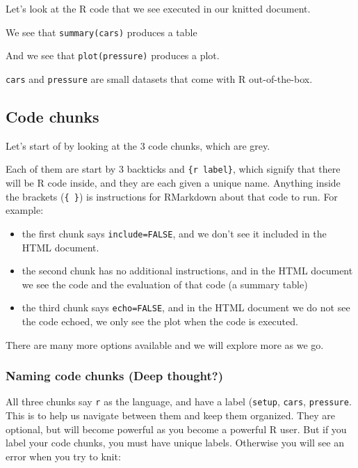 \documentclass[]{book}
\providecommand{\tightlist}{%
  \setlength{\itemsep}{0pt}\setlength{\parskip}{0pt}}
\begin{document}
Let's look at the R code that we see executed in our knitted document.

We see that \texttt{summary(cars)} produces a table

And we see that \texttt{plot(pressure)} produces a plot.

\texttt{cars} and \texttt{pressure} are small datasets that come with R out-of-the-box.

\hypertarget{code-chunks}{%
\subsection{Code chunks}\label{code-chunks}}

Let's start of by looking at the 3 code chunks, which are grey.

Each of them are start by 3 backticks and \texttt{\{r\ label\}}, which signify that there will be R code inside, and they are each given a unique name. Anything inside the brackets (\texttt{\{\ \}}) is instructions for RMarkdown about that code to run. For example:

\begin{itemize}
\tightlist
\item
  the first chunk says \texttt{include=FALSE}, and we don't see it included in the HTML document.
\item
  the second chunk has no additional instructions, and in the HTML document we see the code and the evaluation of that code (a summary table)
\item
  the third chunk says \texttt{echo=FALSE}, and in the HTML document we do not see the code echoed, we only see the plot when the code is executed.
\end{itemize}

There are many more options available and we will explore more as we go.

\hypertarget{naming-code-chunks-deep-thought}{%
\subsubsection{Naming code chunks (Deep thought?)}\label{naming-code-chunks-deep-thought}}

All three chunks say \texttt{r} as the language, and have a label (\texttt{setup}, \texttt{cars}, \texttt{pressure}. This is to help us navigate between them and keep them organized. They are optional, but will become powerful as you become a powerful R user. But if you label your code chunks, you must have unique labels. Otherwise you will see an error when you try to knit:
\end{document}
